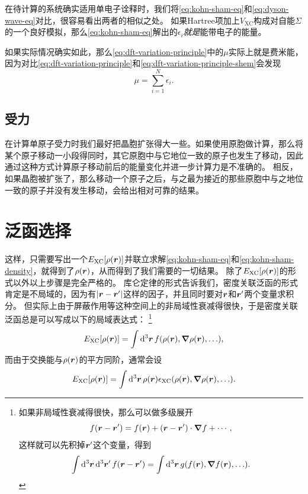 在待计算的系统确实适用单电子诠释时，我们将\eqref{eq:kohn-sham-eq}和\eqref{eq:dyson-wave-eq}对比，很容易看出两者的相似之处。
如果Hartree项加上$V_\text{XC}$构成对自能$\Sigma$的一个良好模拟，那么\eqref{eq:kohn-sham-eq}解出的$\epsilon_i$\emph{就是}能带电子的能量。

如果实际情况确实如此，那么\eqref{eq:dft-variation-principle}中的$\mu$实际上就是费米能，因为对比\eqref{eq:dft-variation-principle}和\eqref{eq:dft-variation-principle-shem}会发现
\begin{equation}
    \mu = \sum_{i=1}^N \epsilon_i.
\end{equation}

\subsection{受力}

在计算单原子受力时我们最好把晶胞扩张得大一些。如果使用原胞做计算，那么将某个原子移动一小段得同时，其它原胞中与它地位一致的原子也发生了移动，因此通过这种方式计算原子移动前后的能量变化并进一步计算力是不准确的。
相反，如果晶胞被扩张了，那么移动一个原子之后，与之最为接近的那些原胞中与之地位一致的原子并没有发生移动，会给出相对可靠的结果。

\section{泛函选择}

这样，只需要写出一个$E_\text{XC}[\rho(\vb*{r})]$并联立求解\eqref{eq:kohn-sham-eq}和\eqref{eq:kohn-sham-density}，就得到了$\rho(\vb*{r})$，从而得到了我们需要的一切结果。
除了$E_\text{XC}[\rho(\vb*{r})]$的形式以外以上步骤是完全严格的。
库仑定律的形式告诉我们，密度关联泛函的形式肯定是不局域的，因为有$\abs{\vb*{r} - \vb*{r}'}$这样的因子，并且同时要对$\vb*{r}$和$\vb*{r}'$两个变量求积分。
但实际上由于屏蔽作用等这种空间上的非局域性衰减得很快，于是密度关联泛函总是可以写成以下的局域表达式：%
\footnote{
    如果非局域性衰减得很快，那么可以做多级展开
    \[
        f(\vb*{r} - \vb*{r}') = f(\vb*{r}) + (\vb*{r} - \vb*{r}') \cdot \grad{f} + \cdots,
    \]
    这样就可以先积掉$\vb*{r}'$这个变量，得到
    \[
        \int \dd[3]{\vb*{r}} \dd[3]{\vb*{r}'} f(\vb*{r} - \vb*{r}') = \int \dd[3]{\vb*{r}} g(f(\vb*{r}), \grad{f(\vb*{r})}, \ldots).
    \]
}%
\[
    E_\text{XC}[\rho(\vb*{r})] = \int \dd[3]{\vb*{r}} f(\rho(\vb*{r}), \grad{\rho(\vb*{r})}, \ldots),
\]
而由于交换能与$\rho(\vb*{r})$的平方同阶，通常会设
\begin{equation}
    E_\text{XC}[\rho(\vb*{r})] = \int \dd[3]{\vb*{r}} \rho(\vb*{r}) \epsilon_\text{XC}(\rho(\vb*{r}), \grad{\rho(\vb*{r})}, \ldots).
\end{equation}

